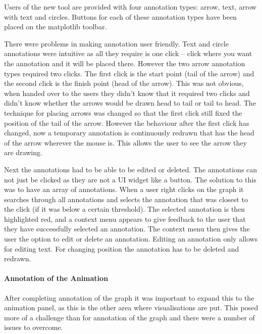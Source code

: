 Users of the new tool are provided with four annotation types: arrow, text, arrow with text and circles.  Buttons for each of these annotation types have been placed on the matplotlib toolbar.

There were problems in making annotation user friendly.  Text and circle annotations were intuitive as all they require is one click -- click where you want the annotation and it will be placed there.  However the two arrow annotation types required two clicks.  The first click is the start point (tail of the arrow) and the second click is the finish point (head of the arrow).  This was not obvious, when handed over to the users they didn't know that it required two clicks and didn't know whether the arrows would be drawn head to tail or tail to head.  The technique for placing arrows was changed so that the first click still fixed the position of the tail of the arrow. However the behaviour after the first click has changed, now a temporary annotation is continuously redrawn that has the head of the arrow wherever the mouse is.  This allows the user to see the arrow they are drawing.

Next the annotations had to be able to be edited or deleted.  The annotations can not just be clicked as they are not a \ac{UI} widget like a button.  The solution to this was to have an array of annotations.  When a user right clicks on the graph it searches through all annotations and selects the annotation that was closest to the click (if it was below a certain threshold).  The selected annotation is then highlighted red, and a context menu appears to give feedback to the user that they have successfully selected an annotation.  The context menu then gives the user the option to edit or delete an annotation.  Editing an annotation only allows for editing text.  For changing position the annotation has to be deleted and redrawn.

\paragraph{Annotation of the Animation}

After completing annotation of the graph it was important to expand this to the animation panel, as this is the other area where visualisations are put.  This posed more of a challenge than for annotation of the graph and there were a number of issues to overcome.


